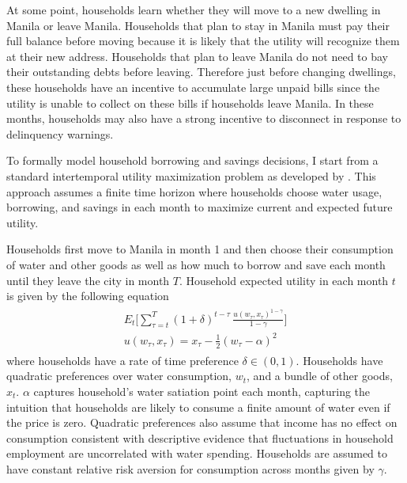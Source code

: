 \documentclass[12pt]{article}
\begin{document}
At some point, households learn whether they will move to a new dwelling in Manila or leave Manila.  Households that plan to stay in Manila must pay their full balance before moving because it is likely that the utility will recognize them at their new address.  Households that plan to leave Manila do not need to bay their outstanding debts before leaving.  Therefore just before changing dwellings, these households have an incentive to accumulate large unpaid bills since the utility is unable to collect on these bills if households leave Manila.  In these months, households may also have a strong incentive to disconnect in response to delinquency warnings.

To formally model household borrowing and savings decisions, I start from a standard intertemporal utility maximization problem as developed by \cite{deaton1991saving}.  This approach assumes a finite time horizon where households choose water usage, borrowing, and savings in each month to maximize current and expected future utility.  

Households first move to Manila in month 1 and then choose their consumption of water and other goods as well as how much to borrow and save each month until they leave the city in month $T$.  Household expected utility in each month $t$ is given by the following equation
\begin{align}\label{eq:u}
\begin{split}
E_t \Big[ \sum_{\tau = t}^{T} (1+\delta)^{t-\tau} \,\frac{u(w_{\tau},x_{\tau})^{1-\gamma}}{1-\gamma}   \Big]\\
u(w_{\tau},x_{\tau}) =  x_{\tau} -  \frac{1}{2} (w_{\tau} - \alpha)^2
\end{split} 
\end{align}
where households have a rate of time preference $\delta \in (0,1)$.  Households have quadratic preferences over water consumption, $w_{t}$, and a bundle of other goods, $x_{t}$.  $\alpha$ captures household's water satiation point each month, capturing the intuition that households are likely to consume a finite amount of water even if the price is zero.  Quadratic preferences also assume that income has no effect on consumption consistent with descriptive evidence that fluctuations in household employment are uncorrelated with water spending.  Households are assumed to have constant relative risk aversion for consumption across months given by $\gamma$.

\end{document}
